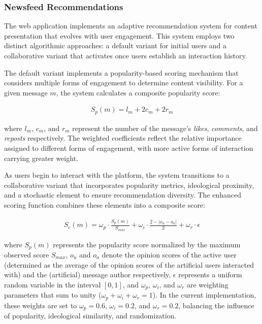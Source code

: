 \subsubsection{Newsfeed Recommendations}

The web application implements an adaptive recommendation system for content presentation that evolves with user engagement. This system employs two distinct algorithmic approaches: a default variant for initial users and a collaborative variant that activates once users establish an interaction history.

The default variant implements a popularity-based scoring mechanism that considers multiple forms of engagement to determine content visibility. For a given message $m$, the system calculates a composite popularity score:

\begin{align}
    S_p(m) = l_m + 2c_m + 2r_m
\end{align}

where $l_m$, $c_m$, and $r_m$ represent the number of the message's \emph{likes}, \emph{comments}, and \emph{reposts} respectively. The weighted coefficients reflect the relative importance assigned to different forms of engagement, with more active forms of interaction carrying greater weight.

As users begin to interact with the platform, the system transitions to a collaborative variant that incorporates popularity metrics, ideological proximity, and a stochastic element to ensure recommendation diversity. The enhanced scoring function combines these elements into a composite score:

\begin{align}
    S_c(m) = \omega_p \cdot \frac{S_p(m)}{S_{max}} + \omega_i \cdot \frac{2 - |o_u - o_a|}{2} + \omega_r \cdot \epsilon
\end{align}

where $S_p(m)$ represents the popularity score normalized by the maximum observed score $S_{max}$, $o_u$ and $o_a$ denote the opinion scores of the active user (determined as the average of the opinion scores of the artificial users interacted with) and the (artificial) message author respectively, $\epsilon$ represents a uniform random variable in the interval $[0,1]$, and $\omega_p$, $\omega_i$, and $\omega_r$ are weighting parameters that sum to unity ($\omega_p + \omega_i + \omega_r = 1$). In the current implementation, these weights are set to $\omega_p = 0.6$, $\omega_i = 0.2$, and $\omega_r = 0.2$, balancing the influence of popularity, ideological similarity, and randomization.

